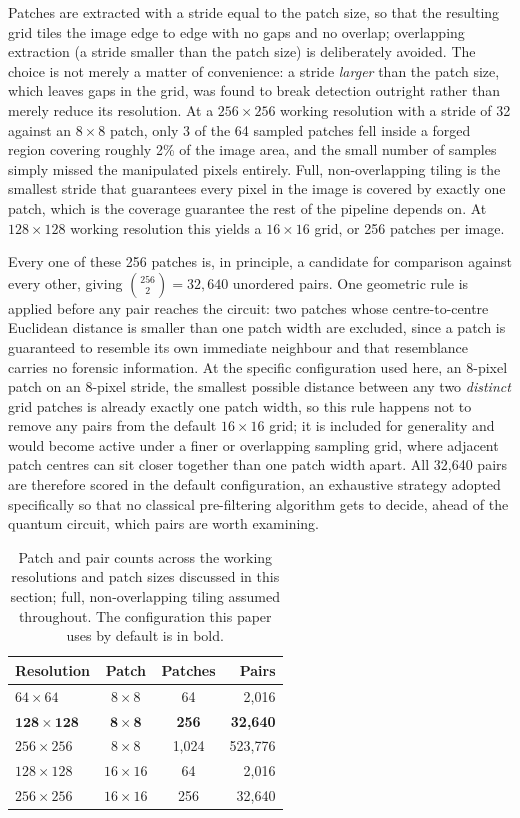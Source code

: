 \documentclass[conference]{IEEEtran}
\begin{document}
Patches are extracted with a stride equal to the patch size, so that the resulting grid tiles the image edge to edge with no gaps and no overlap; overlapping extraction (a stride smaller than the patch size) is deliberately avoided. The choice is not merely a matter of convenience: a stride \emph{larger} than the patch size, which leaves gaps in the grid, was found to break detection outright rather than merely reduce its resolution. At a $256\times256$ working resolution with a stride of 32 against an $8\times8$ patch, only 3 of the 64 sampled patches fell inside a forged region covering roughly 2\% of the image area, and the small number of samples simply missed the manipulated pixels entirely. Full, non-overlapping tiling is the smallest stride that guarantees every pixel in the image is covered by exactly one patch, which is the coverage guarantee the rest of the pipeline depends on. At $128\times128$ working resolution this yields a $16\times16$ grid, or 256 patches per image.

Every one of these 256 patches is, in principle, a candidate for comparison against every other, giving $\binom{256}{2} = 32{,}640$ unordered pairs. One geometric rule is applied before any pair reaches the circuit: two patches whose centre-to-centre Euclidean distance is smaller than one patch width are excluded, since a patch is guaranteed to resemble its own immediate neighbour and that resemblance carries no forensic information. At the specific configuration used here, an 8-pixel patch on an 8-pixel stride, the smallest possible distance between any two \emph{distinct} grid patches is already exactly one patch width, so this rule happens not to remove any pairs from the default $16\times16$ grid; it is included for generality and would become active under a finer or overlapping sampling grid, where adjacent patch centres can sit closer together than one patch width apart. All 32,640 pairs are therefore scored in the default configuration, an exhaustive strategy adopted specifically so that no classical pre-filtering algorithm gets to decide, ahead of the quantum circuit, which pairs are worth examining.

\begin{table}[t]
\centering
\caption{Patch and pair counts across the working resolutions and patch sizes discussed in this section; full, non-overlapping tiling assumed throughout. The configuration this paper uses by default is in bold.}
\label{tab:pairscaling}
\begin{tabular}{lccr}
\toprule
\textbf{Resolution} & \textbf{Patch} & \textbf{Patches} & \textbf{Pairs}\\
\midrule
$64\times64$ & $8\times8$ & 64 & 2,016\\
$\mathbf{128\times128}$ & $\mathbf{8\times8}$ & \textbf{256} & \textbf{32,640}\\
$256\times256$ & $8\times8$ & 1,024 & 523,776\\
$128\times128$ & $16\times16$ & 64 & 2,016\\
$256\times256$ & $16\times16$ & 256 & 32,640\\
\bottomrule
\end{tabular}
\end{table}
\end{document}
